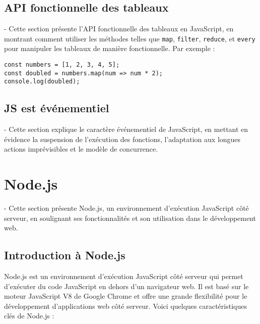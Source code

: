 \documentclass{article}
\begin{document}
\subsection{API fonctionnelle des tableaux}
- Cette section présente l'API fonctionnelle des tableaux en JavaScript, en montrant comment utiliser les méthodes telles que \texttt{map}, \texttt{filter}, \texttt{reduce}, et \texttt{every} pour manipuler les tableaux de manière fonctionnelle. Par exemple :
\begin{verbatim}
const numbers = [1, 2, 3, 4, 5];
const doubled = numbers.map(num => num * 2);
console.log(doubled);
\end{verbatim}

\subsection{JS est événementiel}
- Cette section explique le caractère événementiel de JavaScript, en mettant en évidence la suspension de l'exécution des fonctions, l'adaptation aux longues actions imprévisibles et le modèle de concurrence.


\section{Node.js}
- Cette section présente Node.js, un environnement d'exécution JavaScript côté serveur, en soulignant ses fonctionnalités et son utilisation dans le développement web.

\subsection {Introduction à Node.js}
Node.js est un environnement d'exécution JavaScript côté serveur qui permet d'exécuter du code JavaScript en dehors d'un navigateur web. Il est basé sur le moteur JavaScript V8 de Google Chrome et offre une grande flexibilité pour le développement d'applications web côté serveur. 
Voici quelques caractéristiques clés de Node.js : 
 
\end{document}
